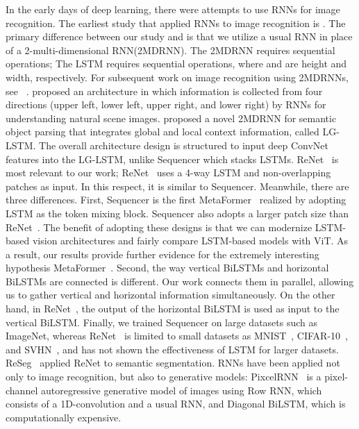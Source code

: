 \documentclass{article}
\begin{document}
In the early days of deep learning, there were attempts to use RNNs for image recognition. The earliest study that applied RNNs to image recognition is \cite{graves2007multi}. The primary difference between our study and \cite{graves2007multi} is that we utilize a usual RNN in place of a 2-multi-dimensional RNN(2MDRNN). The 2MDRNN requires  sequential operations; The LSTM requires  sequential operations, where  and  are height and width, respectively. For subsequent work on image recognition using 2MDRNNs, see ~\cite{graves2008offline, kalchbrenner2015grid, byeon2015scene, liang2016semantic}. \cite{byeon2015scene} proposed an architecture in which information is collected from four directions (upper left, lower left, upper right, and lower right) by RNNs for understanding natural scene images. \cite{liang2016semantic} proposed a novel 2MDRNN for semantic object parsing that integrates global and local context information, called LG-LSTM. The overall architecture design is structured to input deep ConvNet features into the LG-LSTM, unlike Sequencer which stacks LSTMs. ReNet~\cite{visin2015renet} is most relevant to our work; ReNet~\cite{visin2015renet} uses a 4-way LSTM and non-overlapping patches as input. In this respect, it is similar to Sequencer. Meanwhile, there are three differences. First, Sequencer is the first MetaFormer~\cite{yu2021metaformer} realized by adopting LSTM as the token mixing block. Sequencer also adopts a larger patch size than ReNet~\cite{visin2015renet}. The benefit of adopting these designs is that we can modernize LSTM-based vision architectures and fairly compare LSTM-based models with ViT. As a result, our results provide further evidence for the extremely interesting hypothesis MetaFormer~\cite{yu2021metaformer}. Second, the way vertical BiLSTMs and horizontal BiLSTMs are connected is different. Our work connects them in parallel, allowing us to gather vertical and horizontal information simultaneously. On the other hand, in ReNet~\cite{visin2015renet}, the output of the horizontal BiLSTM is used as input to the vertical BiLSTM. Finally, we trained Sequencer on large datasets such as ImageNet, whereas ReNet~\cite{visin2015renet} is limited to small datasets as MNIST~\cite{lecun1998gradient}, CIFAR-10~\cite{krizhevsky2009learning}, and SVHN~\cite{netzer2011reading}, and has not shown the effectiveness of LSTM for larger datasets. ReSeg~\cite{visin2016reseg} applied ReNet to semantic segmentation. RNNs have been applied not only to image recognition, but also to generative models: PixcelRNN~\cite{van2016pixel} is a pixel-channel autoregressive generative model of images using Row RNN, which consists of a 1D-convolution and a usual RNN, and Diagonal BiLSTM, which is computationally expensive.
\end{document}
